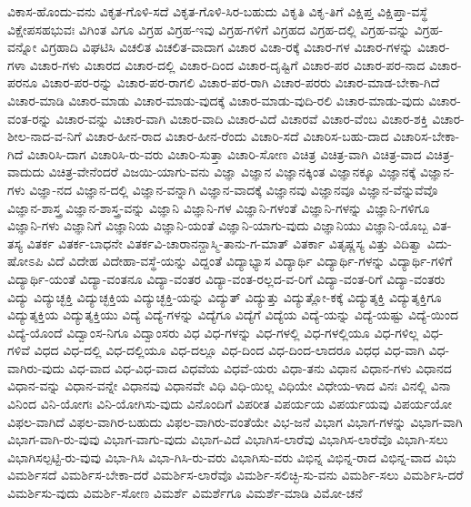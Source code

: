 {ವಿಕಾಸ-ಹೊಂದು-ವನು
ವಿಕೃತ-ಗೊಳಿ-ಸದೆ
ವಿಕೃತ-ಗೊಳಿ-ಸಿರ-ಬಹುದು
ವಿಕೃತಿ
ವಿಕೃ-ತಿಗೆ
ವಿಕ್ಷಿಪ್ತ
ವಿಕ್ಷಿಪ್ತಾ-ವಸ್ಥೆ
ವಿಕ್ಷೇಪಸಹಭುವಃ
ವಿಗಿಂತ
ವಿಗೂ
ವಿಗ್ರಹ
ವಿಗ್ರಹ-ಇವು
ವಿಗ್ರಹ-ಗಳಿಗೆ
ವಿಗ್ರಹದ
ವಿಗ್ರಹ-ದಲ್ಲಿ
ವಿಗ್ರಹ-ವನ್ನು
ವಿಗ್ರಹ-ವನ್ನೋ
ವಿಗ್ರಹಾದಿ
ವಿಘಟಿಸಿ
ವಿಚಲಿತ
ವಿಚಲಿತ-ವಾದಾಗ
ವಿಚಾರ
ವಿಚಾ-ರಕ್ಕೆ
ವಿಚಾರ-ಗಳ
ವಿಚಾರ-ಗಳನ್ನು
ವಿಚಾರ-ಗಳಾ
ವಿಚಾರ-ಗಳು
ವಿಚಾರದ
ವಿಚಾರ-ದಲ್ಲಿ
ವಿಚಾರ-ದಿಂದ
ವಿಚಾರ-ದೃಷ್ಟಿಗೆ
ವಿಚಾರ-ಪರ
ವಿಚಾರ-ಪರ-ನಾದ
ವಿಚಾರ-ಪರನೂ
ವಿಚಾರ-ಪರ-ರನ್ನು
ವಿಚಾರ-ಪರ-ರಾಗಲಿ
ವಿಚಾರ-ಪರ-ರಾಗಿ
ವಿಚಾರ-ಪರರು
ವಿಚಾರ-ಮಾಡ-ಬೇಕಾ-ಗಿದೆ
ವಿಚಾರ-ಮಾಡಿ
ವಿಚಾರ-ಮಾಡು
ವಿಚಾರ-ಮಾಡು-ವುದಕ್ಕೆ
ವಿಚಾರ-ಮಾಡು-ವುದಿ-ರಲಿ
ವಿಚಾರ-ಮಾಡು-ವುದು
ವಿಚಾರ-ವಂತ-ರನ್ನು
ವಿಚಾರ-ವನ್ನು
ವಿಚಾರ-ವಾಗಿ
ವಿಚಾರ-ವಾದಿ
ವಿಚಾರ-ವಿದೆ
ವಿಚಾರವೆ
ವಿಚಾರ-ವೆಂಬ
ವಿಚಾರ-ಶಕ್ತಿ
ವಿಚಾರ-ಶೀಲ-ನಾದ-ವ-ನಿಗೆ
ವಿಚಾರ-ಹೀನ-ರಾದ
ವಿಚಾರ-ಹೀನ-ರೆಂದು
ವಿಚಾರಿ-ಸದೆ
ವಿಚಾರಿಸ-ಬಹು-ದಾದ
ವಿಚಾರಿಸ-ಬೇಕಾ-ಗಿದೆ
ವಿಚಾರಿಸಿ-ದಾಗ
ವಿಚಾರಿಸಿ-ರು-ವರು
ವಿಚಾರಿ-ಸುತ್ತಾ
ವಿಚಾರಿ-ಸೋಣ
ವಿಚಿತ್ರ
ವಿಚಿತ್ರ-ವಾಗಿ
ವಿಚಿತ್ರ-ವಾದ
ವಿಚಿತ್ರ-ವಾದುದು
ವಿಚಿತ್ರ-ವೇನೆಂದರೆ
ವಿಜಯಿ-ಯಾಗು-ವನು
ವಿಜ್ಞಾ
ವಿಜ್ಞಾನ
ವಿಜ್ಞಾನಕ್ಕಿಂತ
ವಿಜ್ಞಾನಕ್ಕೂ
ವಿಜ್ಞಾನಕ್ಕೆ
ವಿಜ್ಞಾನ-ಗಳು
ವಿಜ್ಞಾ-ನದ
ವಿಜ್ಞಾನ-ದಲ್ಲಿ
ವಿಜ್ಞಾನ-ವನ್ನಾಗಿ
ವಿಜ್ಞಾನ-ವಾದಕ್ಕೆ
ವಿಜ್ಞಾನವು
ವಿಜ್ಞಾನವೂ
ವಿಜ್ಞಾನ-ವೆನ್ನುವೆವೊ
ವಿಜ್ಞಾನ-ಶಾಸ್ತ್ರ
ವಿಜ್ಞಾನ-ಶಾಸ್ತ್ರ-ವನ್ನು
ವಿಜ್ಞಾನಿ
ವಿಜ್ಞಾನಿ-ಗಳ
ವಿಜ್ಞಾನಿ-ಗಳಂತೆ
ವಿಜ್ಞಾನಿ-ಗಳನ್ನು
ವಿಜ್ಞಾನಿ-ಗಳಿಗೂ
ವಿಜ್ಞಾನಿ-ಗಳು
ವಿಜ್ಞಾನಿಗೆ
ವಿಜ್ಞಾನಿಯ
ವಿಜ್ಞಾನಿ-ಯಂತೆ
ವಿಜ್ಞಾನಿ-ಯಾಗು-ವುದು
ವಿಜ್ಞಾನಿಯು
ವಿಜ್ಞಾನಿ-ಯೊಬ್ಬ
ವಿತ-ತಸ್ಯ
ವಿತರ್ಕ
ವಿತರ್ಕ-ಬಾಧನೇ
ವಿತರ್ಕವಿ-ಚಾರಾನನ್ದಾಸ್ಮಿ-ತಾನು-ಗ-ಮಾತ್
ವಿತರ್ಕಾ
ವಿತೃಷ್ಣಸ್ಯ
ವಿತ್ತು
ವಿದಿತ್ವಾ
ವಿದು-ಷೋಽಪಿ
ವಿದೆ
ವಿದೇಹ
ವಿದೇಹಾ-ವಸ್ಥೆ-ಯನ್ನು
ವಿದ್ದಂತೆ
ವಿದ್ಯಾಭ್ಯಾಸ
ವಿದ್ಯಾರ್ಥಿ
ವಿದ್ಯಾರ್ಥಿ-ಗಳನ್ನು
ವಿದ್ಯಾರ್ಥಿ-ಗಳಿಗೆ
ವಿದ್ಯಾರ್ಥಿ-ಯಂತೆ
ವಿದ್ಯಾ-ವಂತನೂ
ವಿದ್ಯಾ-ವಂತರ
ವಿದ್ಯಾ-ವಂತ-ರಲ್ಲದ-ವ-ರಿಗೆ
ವಿದ್ಯಾ-ವಂತ-ರಿಗೆ
ವಿದ್ಯಾ-ವಂತರು
ವಿದ್ಯು
ವಿದ್ಯುಚ್ಛಕ್ತಿ
ವಿದ್ಯುಚ್ಛಕ್ತಿಯ
ವಿದ್ಯುಚ್ಛಕ್ತಿ-ಯನ್ನು
ವಿದ್ಯುತ್
ವಿದ್ಯುತ್ತು
ವಿದ್ಯುತ್ಲೋ-ಕಕ್ಕೆ
ವಿದ್ಯುತ್ಶಕ್ತಿ
ವಿದ್ಯುತ್ಶಕ್ತಿಗೂ
ವಿದ್ಯುತ್ಶಕ್ತಿಯ
ವಿದ್ಯುತ್ಶಕ್ತಿಯು
ವಿದ್ಯೆ
ವಿದ್ಯೆ-ಗಳನ್ನು
ವಿದ್ಯೆಗೂ
ವಿದ್ಯೆಗೆ
ವಿದ್ಯೆಯ
ವಿದ್ಯೆ-ಯನ್ನು
ವಿದ್ಯೆ-ಯಷ್ಟು
ವಿದ್ಯೆ-ಯಿಂದ
ವಿದ್ಯೆ-ಯೊಂದೆ
ವಿದ್ವಾಂಸ-ನಿಗೂ
ವಿದ್ವಾಂಸರು
ವಿಧ
ವಿಧ-ಗಳನ್ನು
ವಿಧ-ಗಳಲ್ಲಿ
ವಿಧ-ಗಳಲ್ಲಿಯೂ
ವಿಧ-ಗಳಿಲ್ಲ
ವಿಧ-ಗಳಿವೆ
ವಿಧದ
ವಿಧ-ದಲ್ಲಿ
ವಿಧ-ದಲ್ಲಿಯೂ
ವಿಧ-ದಲ್ಲೂ
ವಿಧ-ದಿಂದ
ವಿಧ-ದಿಂದ-ಲಾದರೂ
ವಿಧಧ
ವಿಧ-ವಾಗಿ
ವಿಧ-ವಾಗಿರು-ವುದು
ವಿಧ-ವಾದ
ವಿಧ-ವಿಧ-ವಾದ
ವಿಧವೆಯ
ವಿಧವೆ-ಯರು
ವಿಧಾ-ತನು
ವಿಧಾನ
ವಿಧಾನ-ಗಳು
ವಿಧಾನದ
ವಿಧಾನ-ವನ್ನು
ವಿಧಾನ-ವನ್ನೇ
ವಿಧಾನವು
ವಿಧಾನವೇ
ವಿಧಿ
ವಿಧಿ-ಯಿಲ್ಲ
ವಿಧಿಯೇ
ವಿಧೇಯ-ಳಾದ
ವಿನಃ
ವಿನಲ್ಲಿ
ವಿನಾ
ವಿನಿಂದ
ವಿನಿ-ಯೋಗಃ
ವಿನಿ-ಯೋಗಿಸು-ವುದು
ವಿನೊಂದಿಗೆ
ವಿಪರೀತ
ವಿಪರ್ಯಯ
ವಿಪರ್ಯಯವು
ವಿಪರ್ಯಯೋ
ವಿಫಲ-ವಾಗಿದೆ
ವಿಫಲ-ವಾಗಿರ-ಬಹುದು
ವಿಫಲ-ವಾಗಿರು-ವಂತೆಯೇ
ವಿಭ-ಜನೆ
ವಿಭಾಗ
ವಿಭಾಗ-ಗಳನ್ನು
ವಿಭಾಗ-ವಾಗಿ
ವಿಭಾಗ-ವಾಗಿ-ರು-ವುವು
ವಿಭಾಗ-ವಾಗು-ವುದು
ವಿಭಾಗ-ವಿದೆ
ವಿಭಾಗಿಸ-ಲಾರೆವು
ವಿಭಾಗಿಸ-ಲಾರೆವೊ
ವಿಭಾಗಿ-ಸಲು
ವಿಭಾಗಿಸಲ್ಪಟ್ಟಿ-ರು-ವುವು
ವಿಭಾ-ಗಿಸಿ
ವಿಭಾ-ಗಿಸಿ-ರು-ವರು
ವಿಭಾಗಿಸು-ವರು
ವಿಭಿನ್ನ
ವಿಭಿನ್ನ-ರಾದ
ವಿಭಿನ್ನ-ವಾದ
ವಿಭು
ವಿಮರ್ಶಿಸದೆ
ವಿಮರ್ಶಿಸ-ಬೇಕಾ-ದರೆ
ವಿಮರ್ಶಿಸ-ಲಾರೆವೊ
ವಿಮರ್ಶಿ-ಸಲಿಚ್ಛಿ-ಸು-ವನು
ವಿಮರ್ಶಿ-ಸಲು
ವಿಮರ್ಶಿಸಿ-ದರೆ
ವಿಮರ್ಶಿಸು-ವುದು
ವಿಮರ್ಶಿ-ಸೋಣ
ವಿಮರ್ಶೆ
ವಿಮರ್ಶೆಗೂ
ವಿಮರ್ಶೆ-ಮಾಡಿ
ವಿಮೋ-ಚನೆ
}
